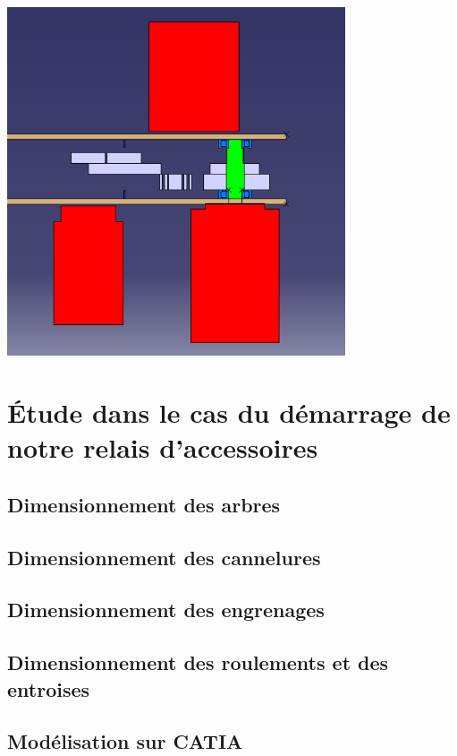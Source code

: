 \documentclass{config}
\begin{document}
\begin{spacing}{1.2}
\begin{center}
\includegraphics[width=0.75\textwidth]{BE_3D_complet_ARO_coupe.PNG}
\end{center}
\newpage
\section{Étude dans le cas du démarrage de notre relais d'accessoires}

\subsection{Dimensionnement des arbres}

\subsection{Dimensionnement des cannelures}

\subsection{Dimensionnement des engrenages}

\subsection{Dimensionnement des roulements et des entroises}

\subsection{Modélisation sur CATIA}

\end{spacing}
\end{document}
